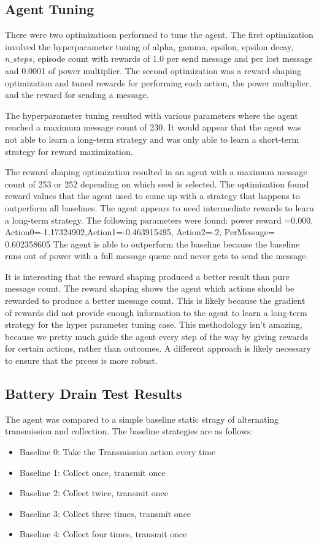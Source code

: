 \documentclass[10pt]{cai}
\begin{document}
\subsection{Agent Tuning}

There were two optimizatiosn performed to tune the agent.
The first optimization involved the hyperparameter tuning of alpha, gamma, epsilon, epsilon decay, $n\_steps$, episode count with rewards of 1.0 per send message and  per lost message and 0.0001 of power multiplier.
The second optimization was a reward shaping optimization and tuned rewards for performing each action, the power multiplier, and the reward for sending a message.

The hyperparameter tuning resulted with various parameters where the agent reached a maximum message count of 230.
It would appear that the agent was not able to learn a long-term strategy and was only able to learn a short-term strategy for reward maximization.

The reward shaping optimization resulted in an agent with a maximum message count of 253 or 252 depending on which seed is selected.
The optimization found reward values that the agent used to come up with a strategy that happens to outperform all baselines.
The agent appears to need intermediate rewards to learn a long-term strategy.
The following parameters were found: power reward =0.000, Action0=-1.17324902,Action1=-0.463915495, Action2=-2, PerMessage=	0.602358605
The agent is able to outperform the baseline because the baseline runs out of power with a full message queue and never gets to send the message. 

It is interesting that the reward shaping produced a better result than pure message count.
The reward shaping shows the agent which actions should be rewarded to produce a better message count.
This is likely because the gradient of rewards did not provide enough information to the agent to learn a long-term strategy for the hyper parameter tuning case.
This methodology isn't amazing, because we pretty much guide the agent every step of the way by giving rewards for certain actions, rather than outcomes. 
A different approach is likely necessary to ensure that the prcess is more robust.


\subsection{Battery Drain Test Results}

The agent was compared to a simple baseline static stragy of alternating transmission and collection.
The baseline strategies are as follows:
\begin{itemize}
  \item Baseline 0: Take the Transmission action every time
  \item Baseline 1: Collect once, transmit once
  \item Baseline 2: Collect twice, transmit once
  \item Baseline 3: Collect three times, transmit once
  \item Baseline 4: Collect four times, transmit once
\end{itemize}
\end{document}
